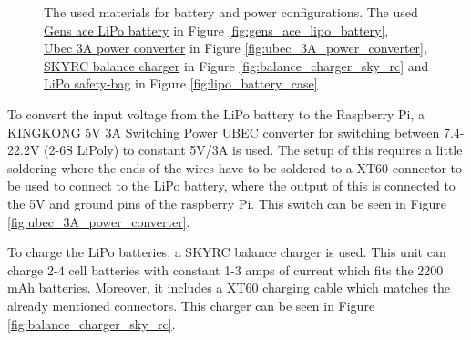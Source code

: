 \documentclass[../Head/report.tex]{subfiles}
\begin{document}
\begin{figure}[H]
    \caption{The used materials for battery and power configurations. The used \href{https://www.conradelektronik.dk/p/gens-ace-modelbyggeri-batteripakke-lipo-111-v-2200-mah-celletal-3-45-c-xt60-2145181?gclid=CjwKCAjwmv-DBhAMEiwA7xYrdyX00RZAovYbKhjWqit3MYObx_NtIH_NOxPih2MBqFoyuJrHtL_R7xoCg28QAvD_BwE&gclsrc=aw.ds&utm_campaign=shopping-feed&utm_content=free-google-shopping-clicks&utm_medium=surfaces&utm_source=google&utm_term=2145181&vat=true}{Gens ace LiPo battery} in Figure \ref{fig:gens_ace_lipo_battery}, \\ \href{https://hobbyking.com/en_us/kingkong-5v-3a-ubec.html?___store=en_us}{Ubec 3A power converter} in Figure \ref{fig:ubec_3A_power_converter}, \href{https://www.banggood.com/da/SKYRC-E430-Balance-Charger-AC-100-240V-Cells-Lipo-LiFe-30W-1A-2A-3A-p-1124821.html?utm_source=googleshopping&utm_medium=cpc_organic&gmcCountry=DK&utm_content=minha&utm_campaign=minha-dk-da-pc&currency=DKK&cur_warehouse=CN&createTmp=1&utm_source=googleshopping&utm_medium=cpc_union&utm_content=sandra&utm_campaign=sandra-ssc-dk-da-all-0302&ad_id=337427030565&gclid=CjwKCAjwmv-DBhAMEiwA7xYrdwCnJMgzOnZp9FJBPNSDSS_RO2Q67TIQ2FderUjGhzySiWRObpBN6xoCtE4QAvD_BwE}{SKYRC balance charger} in Figure \ref{fig:balance_charger_sky_rc} and \href{https://cdon.dk/hjem-have/extron-modellbau-lipo-safety-bag-1-set-p47436624?fo_c=1923&fo_k=47efd6de4697e54ef539b8256db201cb&fo_s=gpladk&utm_medium=cpo&utm_source=tradedoubler&utm_campaign=affiliate&utm_content=tradedoubler_3153538_General_VelkashoppingcomDK}{LiPo safety-bag} in Figure \ref{fig:lipo_battery_case}}
    \label{fig:battery_and_power_connections}
\end{figure}

To convert the input voltage from the LiPo battery to the Raspberry Pi, a KINGKONG 5V 3A Switching Power UBEC converter for switching between 7.4-22.2V (2-6S LiPoly) to constant 5V/3A is used. The setup of this requires a little soldering where the ends of the wires have to be soldered to a XT60 connector to be used to connect to the LiPo battery, where the output of this is connected to the 5V and ground pins of the raspberry Pi. This switch can be seen in Figure \ref{fig:ubec_3A_power_converter}. 

To charge the LiPo batteries, a SKYRC balance charger is used. This unit can charge 2-4 cell batteries with constant 1-3 amps of current which fits the 2200 mAh batteries. Moreover, it includes a XT60 charging cable which matches the already mentioned connectors. This charger can be seen in Figure \ref{fig:balance_charger_sky_rc}.
\end{document}
